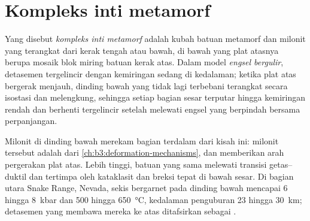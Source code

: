 \section{Kompleks inti metamorf}\label{sec:b3:extension-strike-slip:core}

\begin{definition}\label{def:b3:extension-strike-slip:core-complex}
Yang disebut \emph{kompleks inti metamorf} adalah kubah
batuan metamorf dan milonit yang terangkat dari kerak tengah atau bawah,
di bawah  yang plat atasnya berupa mosaik blok miring
batuan kerak atas. Dalam model \emph{engsel bergulir},
detasemen tergelincir dengan kemiringan sedang di kedalaman; ketika plat atas
bergerak menjauh, dinding bawah yang tidak lagi terbebani terangkat secara isostasi dan melengkung,
sehingga setiap bagian sesar terputar hingga kemiringan rendah dan berhenti tergelincir setelah melewati
engsel yang berpindah bersama perpanjangan.
\end{definition}

Milonit di dinding bawah merekam bagian terdalam dari kisah ini: milonit tersebut adalah
 dari \cref{ch:b3:deformation-mechanisms}, dan 
memberikan arah pergerakan plat atas. Lebih tinggi, batuan yang sama
melewati transisi getas--duktil dan tertimpa oleh
kataklasit dan breksi tepat di bawah sesar. Di bagian utara Snake Range, Nevada,
sekis bergarnet pada dinding bawah mencapai 6 hingga \qty{8}{kbar}
dan 500 hingga \qty{650}{\celsius}, kedalaman penguburan 23 hingga \qty{30}{km}; detasemen yang
membawa mereka ke atas ditafsirkan sebagai .

